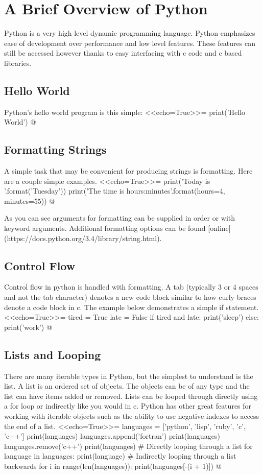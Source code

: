 \documentclass[12pt]{exam}
\begin{document}
\section*{A Brief Overview of Python}
Python is a very high level dynamic programming language. Python emphasizes ease of development over performance and low
level features. These features can still be accessed however thanks to easy interfacing with c code and c based
libraries.
\subsection*{Hello World}
Python's hello world program is this simple:
<<echo=True>>=
print('Hello World')
@

\subsection*{Formatting Strings}
A simple task that may be convenient for producing strings is formatting. Here are a couple simple examples.
<<echo=True>>=
print('Today is {}'.format('Tuesday'))
print('The time is {hours}:{minutes}'.format(hours=4, minutes=55))
@

As you can see arguments for formatting can be supplied in order or with keyword arguments. Additional formatting
options can be found [online](https://docs.python.org/3.4/library/string.html).
\subsection*{Control Flow}
Control flow in python is handled with formatting. A tab (typically 3 or 4 spaces and not the tab character) denotes a
new code block similar to how curly braces denote a code block in c. The example below demonstrates a simple if
statement.
<<echo=True>>=
tired = True
late = False
if tired and late:
    print('sleep')
else:
    print('work')
@

\subsection*{Lists and Looping}
There are many iterable types in Python, but the simplest to understand is the list. A list is an ordered set of
objects. The objects can be of any type and the list can have items added or removed. Lists can be looped through
directly using a for loop or indirectly like you would in c. Python has other great features for working with iterable
objects such as the ability to use negative indexes to access the end of a list.
<<echo=True>>=
languages = ['python', 'lisp', 'ruby', 'c', 'c++']
print(languages)
languages.append('fortran')
print(languages)
languages.remove('c++')
print(languages)
# Directly looping through a list
for language in languages:
    print(language)
# Indirectly looping through a list backwards
for i in range(len(languages)):
    print(languages[-(i + 1)])
@
\end{document}
